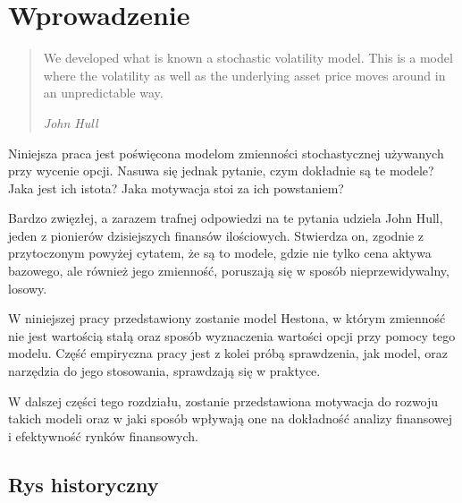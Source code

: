 \documentclass{pracamgr}
\begin{document}
\cleardoublepage
{}
{}
\tableofcontents


\chapter{Wprowadzenie}
\label{chap:introduction}
\begin{quote}

  We developed what is known a stochastic volatility model. 
  This is a model where the volatility as well as the 
  underlying asset price moves around in an unpredictable way.

\raggedleft\slshape John Hull 
\end{quote}
Niniejsza praca jest poświęcona modelom zmienności stochastycznej używanych przy wycenie opcji. 
Nasuwa się jednak pytanie, czym dokładnie są te modele? 
Jaka jest ich istota? Jaka motywacja stoi za ich powstaniem?


Bardzo zwięzłej, a zarazem trafnej odpowiedzi na te pytania udziela John Hull, 
jeden z pionierów dzisiejszych finansów ilościowych. Stwierdza on, zgodnie z przytoczonym 
powyżej cytatem, że są to modele, gdzie nie tylko cena aktywa bazowego, ale również jego zmienność, 
poruszają się w sposób nieprzewidywalny, losowy. 

W niniejszej pracy przedstawiony zostanie model Hestona, w którym zmienność nie jest wartością stałą 
oraz sposób wyznaczenia wartości opcji przy pomocy tego modelu.
Część empiryczna pracy jest z kolei próbą sprawdzenia, jak model, oraz narzędzia do jego stosowania, 
sprawdzają się w praktyce.

W dalszej części tego rozdziału, zostanie przedstawiona motywacja do rozwoju takich modeli oraz w jaki 
sposób wpływają one na dokładność analizy finansowej i efektywność rynków finansowych. 


\section{Rys historyczny} %
\label{sec:rys_historyczny}
\end{document}
